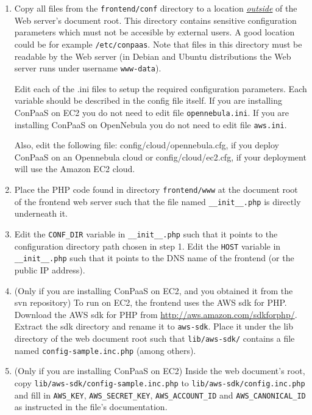 \documentclass[10pt]{article}
\begin{document}
\begin{enumerate}
\item Copy all files from the \verb+frontend/conf+ directory to a
  location \uline{\emph{outside}} of the Web server's document root.
  This directory contains sensitive configuration parameters which
  must not be accesible by external users. A good location could be
  for example \verb+/etc/conpaas+. Note that files in this
  directory must be readable by the Web server (in Debian and Ubuntu
  distributions the Web server runs under username \verb+www-data+).

  Edit each of the .ini files to setup the required configuration
  parameters. Each variable should be described in the config file
  itself. If you are installing ConPaaS on EC2 you do not need to edit
  file \verb+opennebula.ini+. If you are installing ConPaaS on
  OpenNebula you do not need to edit file \verb+aws.ini+.

  Also, edit the following file: config/cloud/opennebula.cfg, if you
  deploy ConPaaS on an Opennebula cloud or config/cloud/ec2.cfg, if
  your deployment will use the Amazon EC2 cloud.

\item Place the PHP code found in directory \verb+frontend/www+ at the
  document root of the frontend web server such that the file named
  \verb+__init__.php+ is directly underneath it.

\item Edit the \verb+CONF_DIR+ variable in \verb+__init__.php+ such
  that it points to the configuration directory path chosen in step 1.
  Edit the \verb+HOST+ variable in \verb+__init__.php+ such that
  it points to the DNS name of the frontend (or the public IP address).

\item (Only if you are installing ConPaaS on EC2, and you obtained it 
  from the svn repository) To run on EC2, the frontend uses the AWS
  sdk for PHP. Download the AWS sdk for PHP from
  \url{http://aws.amazon.com/sdkforphp/}.  Extract the sdk directory
  and rename it to \verb+aws-sdk+. Place it under the lib directory of
  the web document root such that \verb+lib/aws-sdk/+ contains a
  file named \verb+config-sample.inc.php+ (among others).

\item (Only if you are installing ConPaaS on EC2) 
  Inside the web document's root, copy
  \verb+lib/aws-sdk/config-sample.inc.php+ to
  \verb+lib/aws-sdk/config.inc.php+ and fill in \verb+AWS_KEY+,
  \verb+AWS_SECRET_KEY+, \verb+AWS_ACCOUNT_ID+ and
  \verb+AWS_CANONICAL_ID+ as instructed in the file's documentation.


\end{enumerate}
\end{document}
